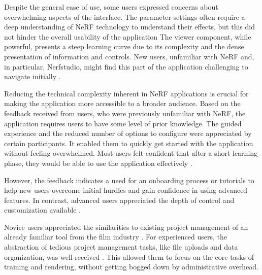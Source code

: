 Despite the general ease of use, some users expressed concerns about overwhelming aspects of the interface.
The parameter settings often require a deep understanding of NeRF technology to understand their effects, but this did not hinder the overall usability of the application \cite{P5, P7}
The viewer component, while powerful, presents a steep learning curve due to its complexity and the dense presentation of information and controls. 
New users, unfamiliar with NeRF and, in particular, Nerfstudio, might find this part of the application challenging to navigate initially \cite{P2}.


Reducing the technical complexity inherent in NeRF applications is crucial for making the application more accessible to a broader audience.
Based on the feedback received from users, who were previously unfamiliar with NeRF, the application requires users to have some level of prior knowledge.
The guided experience and the reduced number of options to configure were appreciated by certain participants.
It enabled them to quickly get started with the application without feeling overwhelmed.
Most users felt confident that after a short learning phase, they would be able to use the application effectively \cite{P2, P3, P4, P5, P6, P7, P8}.

However, the feedback indicates a need for an onboarding process or tutorials to help new users overcome initial hurdles and gain confidence in using advanced features.
In contrast, advanced users appreciated the depth of control and customization available \cite{P9, P10}.


Novice users appreciated the similarities to existing project management of an already familiar tool from the film industry \cite{P5}. 
For experienced users, the abstraction of tedious project management tasks, like file uploads and data organization, was well received \cite{P1}.
This allowed them to focus on the core tasks of training and rendering, without getting bogged down by administrative overhead.

